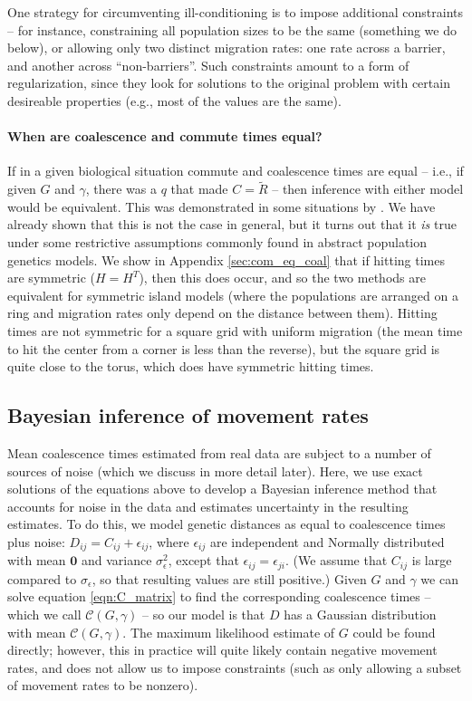 \documentclass{article}
\newcommand{\comdist}{\widetilde{R}}
\begin{document}
One strategy for circumventing ill-conditioning is to impose additional constraints --
for instance, constraining all population sizes to be the same (something we do below),
or allowing only two distinct migration rates: one rate across a barrier, 
and another across ``non-barriers''.
Such constraints amount to a form of regularization,
since they look for solutions to the original problem with certain desireable properties
(e.g., most of the values are the same). 

\paragraph{When are coalescence and commute times equal?}
If in a given biological situation commute and coalescence times are equal --
i.e., if given $G$ and $\gamma$, there was a $q$ that made $C = \comdist$ --
then inference with either model would be equivalent.
This was demonstrated in some situations by \citet{mcrae2006isolation}.
We have already shown that this is not the case in general,
but it turns out that it \emph{is} true
under some restrictive assumptions commonly found in abstract population genetics models. 
We show in Appendix \ref{sec:com_eq_coal} that
if hitting times are symmetric ($H = H^T$),
then this does occur,
and so the two methods are equivalent for symmetric island models
(where the populations are arranged on a ring 
and migration rates only depend on the distance between them).
Hitting times are not symmetric for a square grid with uniform migration
(the mean time to hit the center from a corner is less than the reverse),
but the square grid is quite close to the torus, which does have symmetric hitting times.


\subsection*{Bayesian inference of movement rates}

Mean coalescence times estimated from real data are subject to a number of sources of noise
(which we discuss in more detail later).
Here, we use
exact solutions of the equations above
to develop a Bayesian inference method that accounts for noise in the data
and estimates uncertainty in the resulting estimates.
To do this, we model genetic distances as equal to coalescence times plus noise:
$D_{ij} = C_{ij} + \epsilon_{ij}$,
where $\epsilon_{ij}$ are independent and Normally distributed
with mean $\mathbf{0}$ and variance $\sigma_\epsilon^2$,
except that $\epsilon_{ij} = \epsilon_{ji}$.
(We assume that $C_{ij}$ is large compared to $\sigma_{\epsilon}$, 
so that resulting values are still positive.)
Given $G$ and $\gamma$ we can solve equation \eqref{eqn:C_matrix} 
to find the corresponding coalescence times
-- which we call $\mathcal{C}(G, \gamma)$ --
so our model is that $D$ has a Gaussian distribution 
with mean $\mathcal{C}(G, \gamma)$.
The maximum likelihood estimate of $G$ could be found directly;
however, this in practice will quite likely contain negative movement rates,
and does not allow us to impose constraints
(such as only allowing a subset of movement rates to be nonzero).
\end{document}
